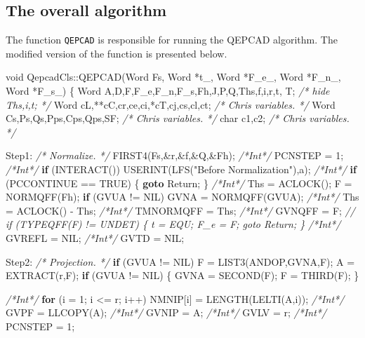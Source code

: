 \documentclass[
]{book}
\newenvironment{Shaded}{\begin{snugshade}}{\end{snugshade}}
\newcommand{\CharTok}[1]{\textcolor[rgb]{0.31,0.60,0.02}{#1}}
\newcommand{\CommentTok}[1]{\textcolor[rgb]{0.56,0.35,0.01}{\textit{#1}}}
\newcommand{\ControlFlowTok}[1]{\textcolor[rgb]{0.13,0.29,0.53}{\textbf{#1}}}
\newcommand{\DataTypeTok}[1]{\textcolor[rgb]{0.13,0.29,0.53}{#1}}
\newcommand{\DecValTok}[1]{\textcolor[rgb]{0.00,0.00,0.81}{#1}}
\newcommand{\NormalTok}[1]{#1}
\newcommand{\StringTok}[1]{\textcolor[rgb]{0.31,0.60,0.02}{#1}}
\theoremstyle{definition}
\theoremstyle{definition}
\theoremstyle{definition}
\theoremstyle{definition}
\theoremstyle{remark}
\begin{document}
\hypertarget{the-overall-algorithm}{%
\subsection{The overall algorithm}\label{the-overall-algorithm}}

The function \texttt{QEPCAD} is responsible for running the QEPCAD algorithm. The modified version of the function is presented below.

\begin{Shaded}
\begin{Highlighting}[numbers=left,,]
\DataTypeTok{void}\NormalTok{ QepcadCls::QEPCAD(Word Fs, Word *t\_, Word *F\_e\_, Word *F\_n\_, Word *F\_s\_)}
\NormalTok{\{}
\NormalTok{    Word A,D,F,F\_e,F\_n,F\_s,Fh,J,P,Q,Ths,f,i,r,t, T;}
    \CommentTok{/* hide Ths,i,t; */}
\NormalTok{    Word cL,**cC,cr,ce,ci,*cT,cj,cs,cl,ct; }\CommentTok{/* Chris variables. */}
\NormalTok{    Word Cs,Ps,Qs,Pps,Cps,Qps,SF; }\CommentTok{/* Chris variables. */}
    \DataTypeTok{char}\NormalTok{ c1,c2; }\CommentTok{/* Chris variables. */}

\NormalTok{Step1: }\CommentTok{/* Normalize. */}
\NormalTok{    FIRST4(Fs,\&r,\&f,\&Q,\&Fh);}
    \CommentTok{/*Int*/}\NormalTok{ PCNSTEP = }\DecValTok{1}\NormalTok{;}
    \CommentTok{/*Int*/} \ControlFlowTok{if}\NormalTok{ (INTERACT()) USERINT(LFS(}\StringTok{"Before Normalization"}\NormalTok{),}\CharTok{\textquotesingle{}a\textquotesingle{}}\NormalTok{);}
    \CommentTok{/*Int*/} \ControlFlowTok{if}\NormalTok{ (PCCONTINUE == TRUE) \{ }\ControlFlowTok{goto}\NormalTok{ Return; \}}
    \CommentTok{/*Int*/}\NormalTok{ Ths = ACLOCK();}
\NormalTok{    F = NORMQFF(Fh);}
    \ControlFlowTok{if}\NormalTok{ (GVUA != NIL) GVNA = NORMQFF(GVUA);}
    \CommentTok{/*Int*/}\NormalTok{ Ths = ACLOCK() {-} Ths;}
    \CommentTok{/*Int*/}\NormalTok{ TMNORMQFF = Ths;}
    \CommentTok{/*Int*/}\NormalTok{ GVNQFF = F;}
    \CommentTok{//       if (TYPEQFF(F) != UNDET) \{ t = EQU; F\_e = F; goto Return; \}}
    \CommentTok{/*Int*/}\NormalTok{ GVREFL = NIL;}
    \CommentTok{/*Int*/}\NormalTok{ GVTD = NIL;}

\NormalTok{Step2: }\CommentTok{/* Projection. */}
    \ControlFlowTok{if}\NormalTok{ (GVUA != NIL) F = LIST3(ANDOP,GVNA,F);}
\NormalTok{    A = EXTRACT(r,F);}
    \ControlFlowTok{if}\NormalTok{ (GVUA != NIL) \{}
\NormalTok{        GVNA = SECOND(F);}
\NormalTok{        F = THIRD(F);}
\NormalTok{    \}}

    \CommentTok{/*Int*/} \ControlFlowTok{for}\NormalTok{ (i = }\DecValTok{1}\NormalTok{; i \textless{}= r; i++) NMNIP[i] = LENGTH(LELTI(A,i));}
    \CommentTok{/*Int*/}\NormalTok{ GVPF = LLCOPY(A);}
    \CommentTok{/*Int*/}\NormalTok{ GVNIP = A;}
    \CommentTok{/*Int*/}\NormalTok{ GVLV = r;}
    \CommentTok{/*Int*/}\NormalTok{ PCNSTEP = }\DecValTok{1}\NormalTok{;}


\end{Highlighting}
\end{Shaded}
\end{document}
